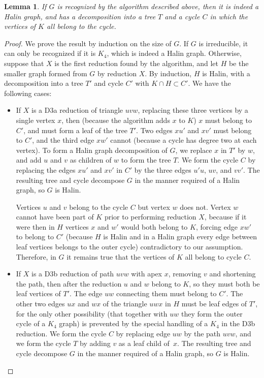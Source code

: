 \documentclass{article}
\newtheorem{lemma}{Lemma}
\begin{document}
\begin{lemma}
\label{lem:no-false-pos}
If $G$ is recognized by the algorithm described above, then it is indeed a Halin graph, and has a decomposition into a tree $T$ and a cycle $C$ in which the vertices of $K$ all belong to the cycle. \end{lemma}

\begin{proof}
We prove the result by induction on the size of $G$. If $G$ is irreducible, it can only be recognized if it is $K_4$, which is indeed a Halin graph. Otherwise, suppose that $X$ is the first reduction found by the algorithm, and let $H$ be the smaller graph formed from $G$ by reduction $X$. By induction, $H$ is Halin, with a decomposition into a tree $T'$ and cycle $C'$ with $K\cap H\subset C'$. We have the following cases:
\begin{itemize}
\item If $X$ is a D3a reduction of triangle $uvw$, replacing these three vertices by a single vertex $x$, then (because the algorithm adds $x$ to $K$) $x$ must belong to $C'$, and must form a leaf of the tree $T'$.  Two edges $xu'$ and $xv'$ must belong to $C'$, and the third edge $xw'$ cannot (because a cycle has degree two at each vertex). To form a Halin graph decomposition of $G$, we replace $x$ in $T'$ by $w$, and add $u$ and $v$ as children of $w$ to form the tree $T$. We form the cycle $C$ by replacing the edges $xu'$ and $xv'$ in $C'$ by the three edges $u'u$, $uv$, and $vv'$. The resulting tree and cycle decompose $G$ in the manner required of a Halin graph, so $G$ is Halin.

Vertices $u$ and $v$ belong to the cycle $C$ but vertex $w$ does not. Vertex $w$ cannot have been part of $K$ prior to performing reduction $X$,
because if it were then in $H$ vertices $x$ and $w'$ would both belong to $K$, forcing edge $xw'$ to belong to $C'$ (because $H$ is Halin and in a Halin graph every edge between leaf vertices belongs to the outer cycle) contradictory to our assumption. Therefore, in $G$ it remains true that the vertices of $K$ all belong to cycle $C$.
\item If $X$ is a D3b reduction of path $uvw$ with apex $x$, removing $v$ and shortening the path,
then after the reduction $u$ and $w$ belong to $K$, so they must both be leaf vertices of $T'$. The edge $uw$ connecting them must belong to $C'$. The other two edges $ux$ and $wx$ of the triangle $uwx$ in $H$ must be leaf edges of $T'$, for the only other possibility (that together with $uw$ they form the outer cycle of a $K_4$ graph) is prevented by the special handling of a $K_4$ in the D3b reduction. We form the cycle $C$ by replacing edge $uw$ by the path $uvw$, and we form the cycle $T$ by adding $v$ as a leaf child of~$x$. The resulting tree and cycle decompose $G$ in the manner required of a Halin graph, so $G$ is Halin.


\end{itemize}
\end{proof}
\end{document}
